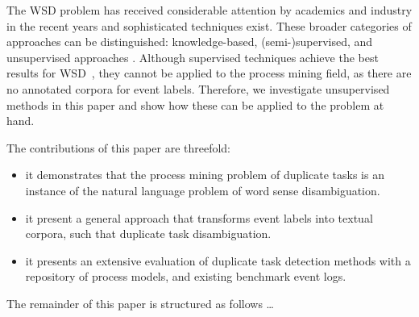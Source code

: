 The WSD problem has received considerable attention by academics and industry in the recent years and sophisticated techniques exist. These broader categories of approaches can be distinguished: knowledge-based, (semi-)supervised, and unsupervised approaches \cite{DBLP:journals/csur/Navigli09}. Although supervised techniques achieve the best results for WSD~\cite{iacobacci2016embeddings}, they cannot be applied to the process mining field, as there are no annotated corpora for event labels. Therefore, we investigate unsupervised methods in this paper and show how these can be applied to the problem at hand. 


The contributions of this paper are threefold:
\begin{itemize}
	\item it demonstrates that the process mining problem of duplicate tasks is an instance of the natural language problem of word sense disambiguation.
	\item it present a general approach that transforms event labels into textual corpora, such that duplicate task disambiguation.
	\item it presents an extensive evaluation of duplicate task detection methods with a repository of process models, and existing benchmark event logs.
\end{itemize}

The remainder of this paper is structured as follows \ldots